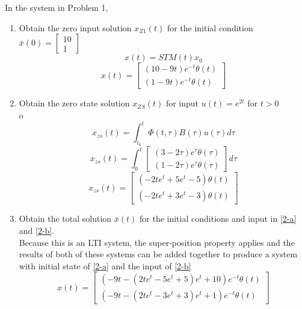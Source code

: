 \item In the system in Problem 1,
  \begin{enumerate}
  \item Obtain the zero input solution $x_{Z1}(t)$ for the initial condition
    $\bar x(0) = \begin{bmatrix}
10\\
1
\end{bmatrix}
$ \label{2-a} \\
    \begin{equation}
x(t) = STM(t)x_0\end{equation}
\begin{equation}
x(t) =\left[\begin{matrix}\left(10 - 9 t\right) e^{- t} \theta\left(t\right)\\\left(1 - 9 t\right) e^{- t} \theta\left(t\right)\end{matrix}\right]\end{equation}

  \item Obtain the zero state solution $x_{ZS}(t)$ for input $u(t) = e^{2t}$ for $t > 0$ \label{2-b}\\o
    \begin{equation}
x_{zs}(t) = \int_{t_0}^t \Phi(t,\tau)B(\tau)u(\tau)d\tau\end{equation}
\begin{equation}
x_{zs}(t) = \int_0^t\left[\begin{matrix}\left(3 - 2 \tau\right) e^{\tau} \theta\left(\tau\right)\\\left(1 - 2 \tau\right) e^{\tau} \theta\left(\tau\right)\end{matrix}\right]d\tau\end{equation}
\begin{equation}
x_{zs}(t) = \left[\begin{matrix}\left(- 2 t e^{t} + 5 e^{t} - 5\right) \theta\left(t\right)\\\left(- 2 t e^{t} + 3 e^{t} - 3\right) \theta\left(t\right)\end{matrix}\right]\end{equation}

  \item Obtain the total solution $\bar x(t)$ for the initial conditions and input in \ref{2-a} and
    \ref{2-b}.\\
    
    Because this is an LTI system, the super-position property applies and the results of both of these systems
    can be added together to produce a system with initial state of \ref{2-a} and the input of \ref{2-b}
    \begin{equation}
x(t) = \left[\begin{matrix}\left(- 9 t - \left(2 t e^{t} - 5 e^{t} + 5\right) e^{t} + 10\right) e^{- t} \theta\left(t\right)\\\left(- 9 t - \left(2 t e^{t} - 3 e^{t} + 3\right) e^{t} + 1\right) e^{- t} \theta\left(t\right)\end{matrix}\right]\end{equation}

    
  \end{enumerate}